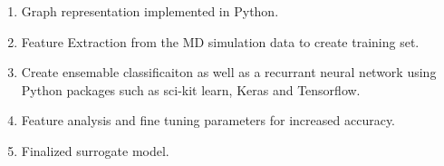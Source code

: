 \begin{enumerate}

\item { Graph representation implemented in Python.}
\item {Feature Extraction from the MD simulation data to create training set.} 
\item {Create ensemable classificaiton  as well as a recurrant neural network using Python packages such as sci-kit learn, Keras and Tensorflow.} 
\item {Feature analysis and fine tuning parameters for increased accuracy. } 
\item {Finalized surrogate model.}
        
\end{enumerate}









